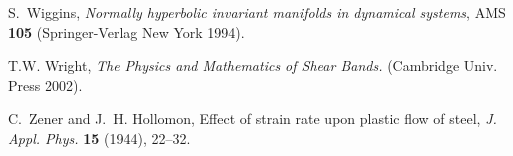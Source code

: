\documentclass[usletter,11pt]{article}
\theoremstyle{remark}
\begin{document}
\begin{thebibliography}{10}
%
%
{\sc S.~Wiggins}, 
{\it Normally hyperbolic invariant manifolds in dynamical  systems}, AMS {\bf 105} (Springer-Verlag New York 1994).

{\sc T.W. Wright},
{\it The Physics and Mathematics of Shear Bands.} (Cambridge Univ. Press 2002).

%


{\sc C.~Zener and J.~H. Hollomon},
Effect of strain rate upon plastic flow of steel,
{\it J. Appl. Phys.}
{\bf 15} (1944), 22--32.

\end{thebibliography}
\end{document}
